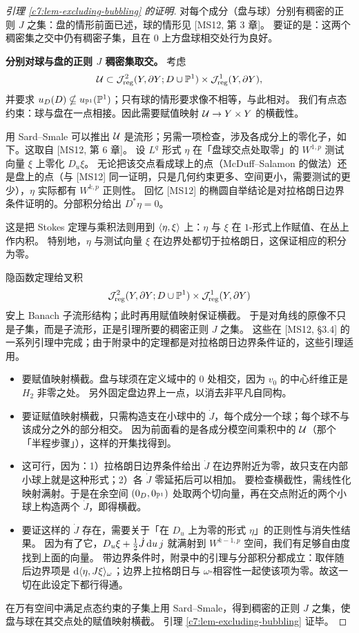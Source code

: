 \begin{proof}[{引理 \ref{c7:lem-excluding-bubbling} 的证明}]
对每个成分（盘与球）分别有稠密的正则 $J$ 之集：盘的情形前面已述，球的情形见 [MS12, 第 3 章]。
要证的是：这两个稠密集之交中仍有稠密子集，且在 $0$ 上方盘球相交处行为良好。

\textbf{分别对球与盘的正则 $J$ 稠密集取交。}
考虑
\[
\mathcal{U}\subset\mathcal{J}^2_{\mathrm{reg}}(Y,\partial Y;D\cup\mathbb{P}^1)\times\mathcal{J}^1_{\mathrm{reg}}(Y,\partial Y),
\]
并要求 $u_D(D)\nsubseteq u_{\mathbb{P}^1}(\mathbb{P}^1)$；只有球的情形要求像不相等，与此相对。
我们有点态约束：球与盘在一点相接。因此需要赋值映射 $\mathcal{U}\to Y\times Y$ 的横截性。

用 Sard--Smale 可以推出 $\mathcal{U}$ 是流形；另需一项检查，涉及各成分上的零化子，如下。这取自 [MS12, 第 6 章]。
设 $L^q$ 形式 $\eta$ 在「盘球交点处取零」的 $W^{1,p}$ 测试向量 $\xi$ 上零化 $D_u\xi$。
无论把该交点看成球上的点（McDuff--Salamon 的做法）还是盘上的点（与 [MS12] 同一证明，只是几何约束更多、空间更小，需要测试的更少），$\eta$ 实际都有 $W^{k,p}$ 正则性。
回忆 [MS12] 的椭圆自举结论是对拉格朗日边界条件证明的。分部积分给出 $D^*\eta=0$。


这是把 Stokes 定理与乘积法则用到 $\langle \eta,\xi\rangle$ 上：$\eta$ 与 $\xi$ 在 $1$-形式上作赋值、在丛上作内积。
特别地，$\eta$ 与测试向量 $\xi$ 在边界处都切于拉格朗日，这保证相应的积分为零。

隐函数定理给叉积
\[
\mathcal{J}^2_{\mathrm{reg}}(Y,\partial Y;D\cup\mathbb{P}^1)\times\mathcal{J}^1_{\mathrm{reg}}(Y,\partial Y)
\]
安上 Banach 子流形结构；此时再用赋值映射保证横截。
于是对角线的原像不只是子集，而是子流形，正是引理所要的稠密正则 $J$ 之集。
这些在 [MS12, §3.4] 的一系列引理中完成；由于附录中的定理都是对拉格朗日边界条件证的，这些引理适用。

\begin{itemize}[leftmargin=1.6em,itemsep=0.2em]
\item 要赋值映射横截。盘与球须在定义域中的 $0$ 处相交，因为 $v_0$ 的中心纤维正是 $H_2$ 非零之处。
      另外固定盘边界上一点，以消去非平凡自同构。
\item 要证赋值映射横截，只需构造支在小球中的 $\dot J$，每个成分一个球；每个球不与该成分之外的部分相交。
      因为前面看的是各成分模空间乘积中的 $\mathcal{U}$（那个「半程步骤」），这样的开集找得到。
\item 这可行，因为：1）拉格朗日边界条件给出 $\dot J$ 在边界附近为零，故只支在内部小球上就是这种形式；2）各 $\dot J$ 零延拓后可以相加。
      要检查横截性，需线性化映射满射。于是在余空间 $(0_D,0_{\mathbb{P}^1})$ 处取两个切向量，再在交点附近的两个小球上构造两个 $\dot J$，即得横截。
\item 要证这样的 $\dot J$ 存在，需要关于「在 $D_u$ 上为零的形式 $\eta$」的正则性与消失性结果。
      因为有了它，$D_u\xi+\frac12\dot J\,\mathrm{d} u\,j$ 就满射到 $W^{k-1,p}$ 空间，我们有足够自由度找到上面的向量。
      带边界条件时，附录中的引理与分部积分都成立：取伴随后边界项是 $\mathrm{d}\langle \eta,J\xi\rangle_\omega$；边界上拉格朗日与 $\omega$-相容性一起使该项为零。故这一切在此设定下都行得通。
\end{itemize}

在万有空间中满足点态约束的子集上用 Sard--Smale，得到稠密的正则 $J$ 之集，使盘与球在其交点处的赋值映射横截。
引理 \ref{c7:lem-excluding-bubbling} 证毕。
\end{proof}

